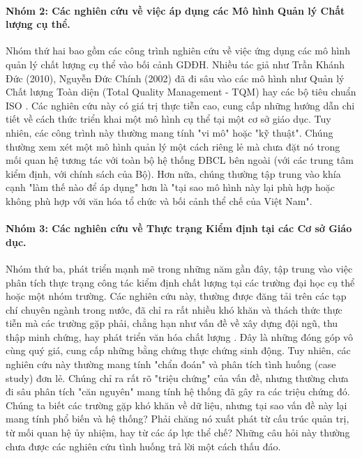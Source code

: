 \documentclass[12pt, a4paper, openany]{report}
\begin{document}
\paragraph{Nhóm 2: Các nghiên cứu về việc áp dụng các Mô hình Quản lý Chất lượng cụ thể.}
Nhóm thứ hai bao gồm các công trình nghiên cứu về việc ứng dụng các mô hình quản lý chất lượng cụ thể vào bối cảnh GDĐH. Nhiều tác giả như Trần Khánh Đức (2010), Nguyễn Đức Chính (2002) đã đi sâu vào các mô hình như Quản lý Chất lượng Toàn diện (Total Quality Management - TQM) hay các bộ tiêu chuẩn ISO \cite{TranKhanhDuc2010, NguyenDucChinh2002}. Các nghiên cứu này có giá trị thực tiễn cao, cung cấp những hướng dẫn chi tiết về cách thức triển khai một mô hình cụ thể tại một cơ sở giáo dục. Tuy nhiên, các công trình này thường mang tính "vi mô" hoặc "kỹ thuật". Chúng thường xem xét một mô hình quản lý một cách riêng lẻ mà chưa đặt nó trong mối quan hệ tương tác với toàn bộ hệ thống ĐBCL bên ngoài (với các trung tâm kiểm định, với chính sách của Bộ). Hơn nữa, chúng thường tập trung vào khía cạnh "làm thế nào để áp dụng" hơn là "tại sao mô hình này lại phù hợp hoặc không phù hợp với văn hóa tổ chức và bối cảnh thể chế của Việt Nam".

\paragraph{Nhóm 3: Các nghiên cứu về Thực trạng Kiểm định tại các Cơ sở Giáo dục.}
Nhóm thứ ba, phát triển mạnh mẽ trong những năm gần đây, tập trung vào việc phân tích thực trạng công tác kiểm định chất lượng tại các trường đại học cụ thể hoặc một nhóm trường. Các nghiên cứu này, thường được đăng tải trên các tạp chí chuyên ngành trong nước, đã chỉ ra rất nhiều khó khăn và thách thức thực tiễn mà các trường gặp phải, chẳng hạn như vấn đề về xây dựng đội ngũ, thu thập minh chứng, hay phát triển văn hóa chất lượng \cite{VJE_Challenges2023, ExpertPerspectivesVN}. Đây là những đóng góp vô cùng quý giá, cung cấp những bằng chứng thực chứng sinh động. Tuy nhiên, các nghiên cứu này thường mang tính "chẩn đoán" và phân tích tình huống (case study) đơn lẻ. Chúng chỉ ra rất rõ "triệu chứng" của vấn đề, nhưng thường chưa đi sâu phân tích "căn nguyên" mang tính hệ thống đã gây ra các triệu chứng đó. Chúng ta biết các trường gặp khó khăn về dữ liệu, nhưng tại sao vấn đề này lại mang tính phổ biến và hệ thống? Phải chăng nó xuất phát từ cấu trúc quản trị, từ mối quan hệ ủy nhiệm, hay từ các áp lực thể chế? Những câu hỏi này thường chưa được các nghiên cứu tình huống trả lời một cách thấu đáo.
\end{document}
